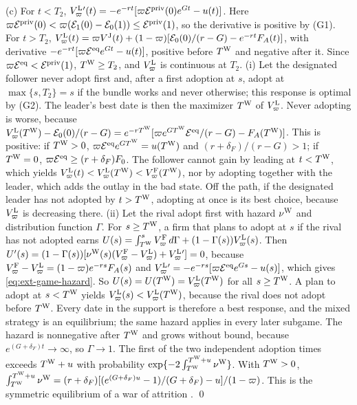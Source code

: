 (c) For $t<T_2$, $V^{\rm L}_\varpi{}'(t)=-e^{-rt}[\varpi\mathcal E^{\rm priv}(0)e^{Gt}-u(t)]$. Here $\varpi\mathcal E^{\rm priv}(0)<\varpi(\mathcal E_1(0)-\mathcal E_0(1))\le\mathcal E^{\rm priv}(1)$, so the derivative is positive by (G1). For $t>T_2$, $V^{\rm L}_\varpi(t)=\varpi V^{\rm J}(t)+(1-\varpi)[\mathcal E_0(0)/(r-G)-e^{-rt}F_A(t)]$, with derivative $-e^{-rt}[\varpi\mathcal E^{\rm eq}e^{Gt}-u(t)]$, positive before $T^{\rm W}$ and negative after it. Since $\varpi\mathcal E^{\rm eq}<\mathcal E^{\rm priv}(1)$, $T^{\rm W}\ge T_2$, and $V^{\rm L}_\varpi$ is continuous at $T_2$. (i) Let the designated follower never adopt first and, after a first adoption at $s$, adopt at $\max\{s,T_2\}=s$ if the bundle works and never otherwise; this response is optimal by (G2). The leader's best date is then the maximizer $T^{\rm W}$ of $V^{\rm L}_\varpi$. Never adopting is worse, because $V^{\rm L}_\varpi(T^{\rm W})-\mathcal E_0(0)/(r-G)=e^{-rT^{\rm W}}[\varpi e^{GT^{\rm W}}\mathcal E^{\rm eq}/(r-G)-F_A(T^{\rm W})]$. This is positive: if $T^{\rm W}>0$, $\varpi\mathcal E^{\rm eq}e^{GT^{\rm W}}=u(T^{\rm W})$ and $(r+\delta_F)/(r-G)>1$; if $T^{\rm W}=0$, $\varpi\mathcal E^{\rm eq}\ge(r+\delta_F)F_0$. The follower cannot gain by leading at $t<T^{\rm W}$, which yields $V^{\rm L}_\varpi(t)<V^{\rm L}_\varpi(T^{\rm W})<V^{\rm F}_\varpi(T^{\rm W})$, nor by adopting together with the leader, which adds the outlay in the bad state. Off the path, if the designated leader has not adopted by $t>T^{\rm W}$, adopting at once is its best choice, because $V^{\rm L}_\varpi$ is decreasing there. (ii) Let the rival adopt first with hazard $\nu^{\rm W}$ and distribution function $\Gamma$. For $s\ge T^{\rm W}$, a firm that plans to adopt at $s$ if the rival has not adopted earns $U(s)=\int_{T^{\rm W}}^sV^{\rm F}_\varpi\,d\Gamma+(1-\Gamma(s))V^{\rm L}_\varpi(s)$. Then $U'(s)=(1-\Gamma(s))[\nu^{\rm W}(s)(V^{\rm F}_\varpi-V^{\rm L}_\varpi)+V^{\rm L}_\varpi{}']=0$, because $V^{\rm F}_\varpi-V^{\rm L}_\varpi=(1-\varpi)e^{-rs}F_A(s)$ and $V^{\rm L}_\varpi{}'=-e^{-rs}[\varpi\mathcal E^{\rm eq}e^{Gs}-u(s)]$, which gives \eqref{eq:ext-game-hazard}. So $U(s)=U(T^{\rm W})=V^{\rm L}_\varpi(T^{\rm W})$ for all $s\ge T^{\rm W}$. A plan to adopt at $s<T^{\rm W}$ yields $V^{\rm L}_\varpi(s)<V^{\rm L}_\varpi(T^{\rm W})$, because the rival does not adopt before $T^{\rm W}$. Every date in the support is therefore a best response, and the mixed strategy is an equilibrium; the same hazard applies in every later subgame. The hazard is nonnegative after $T^{\rm W}$ and grows without bound, because $e^{(G+\delta_F)t}\to\infty$, so $\Gamma\to1$. The first of the two independent adoption times exceeds $T^{\rm W}+u$ with probability $\exp\{-2\int_{T^{\rm W}}^{T^{\rm W}+u}\nu^{\rm W}\}$. With $T^{\rm W}>0$, $\int_{T^{\rm W}}^{T^{\rm W}+u}\nu^{\rm W}=(r+\delta_F)[(e^{(G+\delta_F)u}-1)/(G+\delta_F)-u]/(1-\varpi)$. This is the symmetric equilibrium of a war of attrition \citep{hendricks1988war}. \qed

